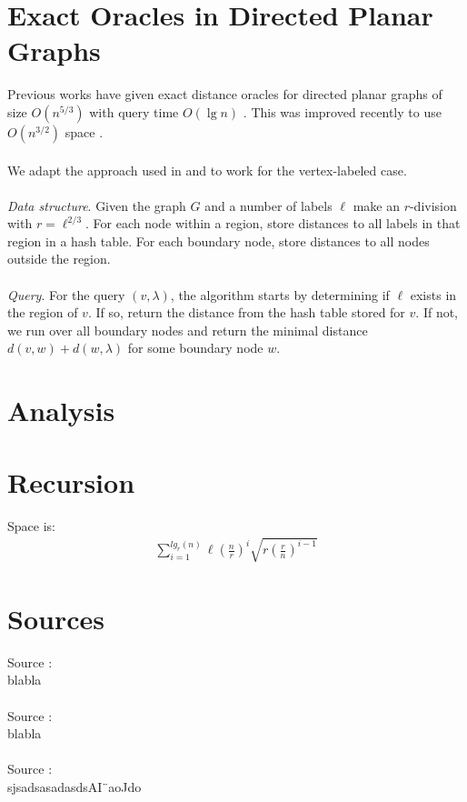 \section{Exact Oracles in Directed Planar Graphs}
\label{sec:sota}
Previous works have given exact distance oracles for directed planar graphs of size
$O(n^{5/3})$ with query time $O(\lg n)$ \cite{cohen2017fast}. This was improved recently
to use $O(n^{3/2})$ space \cite{gawrychowski2017better}. \\
\\
We adapt the approach used in \cite{cohen2017fast} and \cite{gawrychowski2017better} to work
for the vertex-labeled case.\\
\\
\textit{Data structure}. Given the graph $G$ and a number of labels $\ell$ make an
$r$-division with $r=\ell^{2/3}$. For each node within a region, store distances to all
labels in that region in a hash table. For each boundary node, store distances to all
nodes outside the region. \\
\\
\textit{Query}. For the query $(v, \lambda)$, the algorithm starts by determining
if $\ell$ exists in the region of $v$. If so, return the distance from the hash table
stored for $v$. If not, we run over all boundary nodes and return the minimal distance
$d(v,w)+d(w,\lambda)$ for some boundary node $w$.

\section{Analysis}


\section{Recursion}
Space is:
\begin{align*}
  \sum_{i=1}^{lg_r(n)} \ell \left(\frac{n}{r}\right)^i
  \sqrt{r\left(\frac{r}{n}\right)^{i-1}}
\end{align*}

\section{Sources}
Source \cite{chechik2012improved}: \\
blabla \\
\\
Source \cite{hermelin2011distance}: \\
blabla \\
\\
Source \cite{thorup2004compact}: \\
sjsadsasadasdsAI¨aoJdo \\
